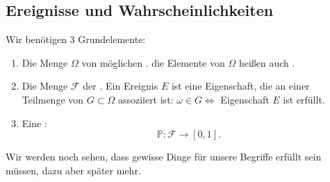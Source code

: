 \subsection{Ereignisse und Wahrscheinlichkeiten}
Wir benötigen 3 Grundelemente:
\begin{enumerate}[(1)]
    \item Die Menge $\Omega$ von möglichen . die Elemente von $\Omega$ heißen auch  .
    \item Die Menge $\mathcal{F}$ der . Ein Ereignis  $E$ ist eine Eigenschaft, die an einer Teilmenge von $G\subset \Omega$ assoziiert ist: $ω\in G \iff $ Eigenschaft $E$ ist erfüllt.
    \item Eine :
        \[
            \mathbb{P}: \mathcal{F} \to  [0,1]
        .\] 
\end{enumerate}
\begin{remark}
    Wir werden noch sehen, dass gewisse Dinge für unsere Begriffe erfüllt sein müssen, dazu aber später mehr.
\end{remark}
